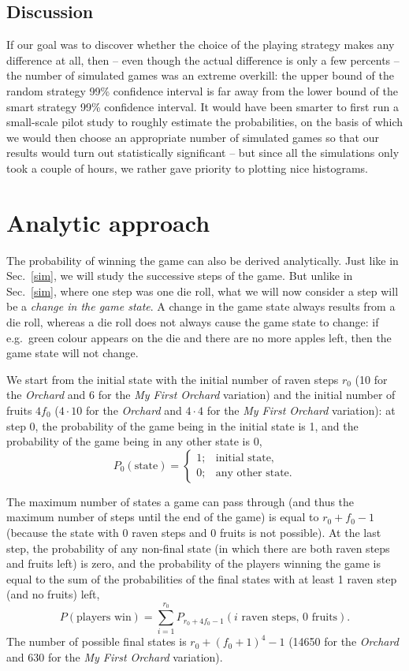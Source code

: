 \documentclass{article}
\begin{document}
\subsection{Discussion}

If our goal was to discover whether the choice of the playing strategy makes any difference at all, then -- even though the actual difference is only a few percents -- the number of simulated games was an extreme overkill: the upper bound of the random strategy 99\% confidence interval is far away from the lower bound of the smart strategy 99\% confidence interval. It would have been smarter to first run a small-scale pilot study to roughly estimate the probabilities, on the basis of which we would then choose an appropriate number of simulated games so that our results would turn out statistically significant -- but since all the simulations only took a couple of hours, we rather gave priority to plotting nice histograms.


\section{Analytic approach}
\label{analytic}

The probability of winning the game can also be derived analytically. Just like in Sec.~\ref{sim}, we will study the successive steps of the game. But unlike in Sec.~\ref{sim}, where one step was one die roll, what we will now consider a step will be a \emph{change in the game state}. A change in the game state always results from a die roll, whereas a die roll does not always cause the game state to change: if e.g.\ green colour appears on the die and there are no more apples left, then the game state will not change.

We start from the initial state with the initial number of raven steps \(r_0\) (10 for the \emph{Orchard} and 6 for the \emph{My First Orchard} variation) and the initial number of fruits \(4f_0\) (\(4 \cdot 10\) for the \emph{Orchard} and \(4 \cdot 4\) for the \emph{My First Orchard} variation): at step 0, the probability of the game being in the initial state is 1, and the probability of the game being in any other state is 0,
\[
    P_0(\text{state})= 
\begin{cases}
    1; & \text{initial state,} \\
    0; & \text{any other state.}
\end{cases}
\]

The maximum number of states a game can pass through (and thus the maximum number of steps until the end of the game) is equal to \(r_0 + f_0 - 1\) (because the state with 0 raven steps and 0 fruits is not possible). At the last step, the probability of any non-final state (in which there are both raven steps and fruits left) is zero, and the probability of the players winning the game is equal to the sum of the probabilities of the final states with at least 1 raven step (and no fruits) left,
\[
  P(\text{players win}) = \sum_{i = 1}^{r_0} P_{r_0 + 4f_0 - 1}(i \text{ raven steps, 0 fruits}).
\]
The number of possible final states is \(r_0 + (f_0 + 1)^4 - 1\) (14650 for the \emph{Orchard} and 630 for the \emph{My First Orchard} variation).
\end{document}
